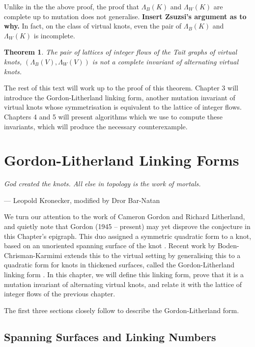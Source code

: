 \documentclass[12pt]{report}
\newcommand{\notered}[1]{{\color{Red} \textbf{#1}}}
\newtheorem*{theorem}{Theorem}
\theoremstyle{upright}
\begin{document}
Unlike in the the above proof, the proof that $\Lambda_{B}(K)$ and $\Lambda_{W}(K)$ are complete up to mutation does not generalise. \notered{Insert Zsuzsi's argument as to why.} In fact, on the class of virtual knots, even the pair of $\Lambda_{B}(K)$ and $\Lambda_{W}(K)$ is incomplete.

\begin{theorem}
The pair of lattices of integer flows of the Tait graphs of virtual knots, $(\Lambda_{B}(V), \Lambda_{W}(V))$ is not a complete invariant of alternating virtual knots.
\end{theorem}

The rest of this text will work up to the proof of this theorem. Chapter 3 will introduce the Gordon-Litherland linking form, another mutation invariant of virtual knots whose symmetrisation is equivalent to the lattice of integer flows. Chapters 4 and 5 will present algorithms which we use to compute these invariants, which will produce the necessary counterexample.


\chapter{Gordon-Litherland Linking Forms}

\epigraph{\itshape God created the knots. All else in topology is the work of mortals.}{--- Leopold Kronecker, modified by Dror Bar-Natan}

We turn our attention to the work of Cameron Gordon and Richard Litherland, and quietly note that Gordon (1945 -- present) may yet disprove the conjecture in this Chapter's epigraph. This duo assigned a symmetric quadratic form to a knot, based on an unoriented spanning surface of the knot \cite{signature-of-a-link}. Recent work by Boden-Chrisman-Karmimi extends this to the virtual setting by generalising this to a quadratic form for knots in thickened surfaces, called the Gordon-Litherland linking form \cite{gordon-litherland-pairing-thickened-surfaces}. In this chapter, we will define this linking form, prove that it is a mutation invariant of alternating virtual knots, and relate it with the lattice of integer flows of the previous chapter.

The first three sections closely follow \cite{gordon-litherland-pairing-thickened-surfaces, alternating-links-thickened-surfaces, mock-seifert-matrices} to describe the Gordon-Litherland form.

\section{Spanning Surfaces and Linking Numbers}
\end{document}
